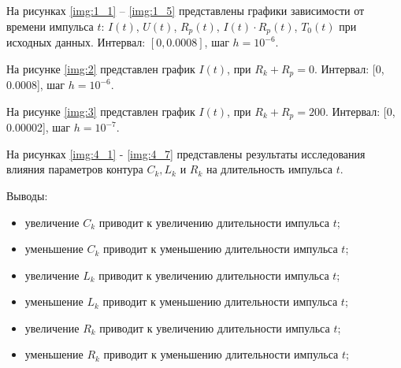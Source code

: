 На рисунках \ref{img:1_1} -- \ref{img:1_5} представлены графики зависимости от времени импульса $t$: $I(t)$, $U(t)$, $R_{p}(t)$, $I(t) \cdot R_{p}(t)$, $T_{0}(t)$ при исходных данных. Интервал: $[0, 0.0008]$, шаг $h = 10^{-6}$.

\clearpage
{}
\clearpage
{}
\clearpage

На рисунке \ref{img:2} представлен график $I(t)$, при $R_{k} + R_{p} = 0$. Интервал: [0, 0.0008], шаг $h = 10^{-6}$.


На рисунке \ref{img:3} представлен график $I(t)$, при $R_{k} + R_{p} = 200$. Интервал: [0, 0.00002], шаг $h = 10^{-7}$.


На рисунках \ref{img:4_1} - \ref{img:4_7} представлены результаты исследования влияния параметров контура $C_{k}, L_{k}$ и $R_{k}$ на длительность импульса $t$.

\clearpage
{}
\clearpage
{}
\clearpage
{}
\clearpage
{}

Выводы:
\begin{itemize}
    \item увеличение $C_{k}$ приводит к увеличению длительности импульса $t$;
    \item уменьшение $C_{k}$ приводит к уменьшению длительности импульса $t$;
    \item увеличение $L_{k}$ приводит к увеличению длительности импульса $t$;
    \item уменьшение $L_{k}$ приводит к уменьшению длительности импульса $t$;
    \item увеличение $R_{k}$ приводит к увеличению длительности импульса $t$;
    \item уменьшение $R_{k}$ приводит к уменьшению длительности импульса $t$;
\end{itemize}

